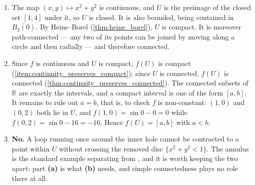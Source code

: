 \begin{exercisesolution}
\label{sol:annulus_continuous_image}
\begin{enumerate}[label=\textbf{(\alph*)}]
  \item The map $(x,y) \mapsto x^2+y^2$ is continuous, and $U$ is the preimage of the closed set
    $[1,4]$ under it, so $U$ is closed. It is also bounded, being contained in
    $\overline{B_2(0)}$. By Heine--Borel (\cref{thm:heine_borel}), $U$ is compact. It is moreover
    path-connected --- any two of its points can be joined by moving along a circle and then
    radially --- and therefore connected.

  \item Since $f$ is continuous and $U$ is compact, $f(U)$ is compact
    (\cref{item:continuity_preserves_compact}); since $U$ is connected, $f(U)$ is connected
    (\cref{thm:continuity_preserves_connected}). The connected subsets of $\mathbb{R}$ are exactly
    the intervals, and a compact interval is one of the form $[a,b]$. It remains to rule out
    $a = b$, that is, to check $f$ is non-constant: $(1,0)$ and $(0,2)$ both lie in $U$, and
    $f(1,0) = \sin 0 - 0 = 0$ while $f(0,2) = \sin 0 - 16 = -16$. Hence $f(U) = [a,b]$ with $a < b$.

  \item \textbf{No.} A loop running once around the inner hole cannot be contracted to a point
    within $U$ without crossing the removed disc $\{x^2+y^2 < 1\}$. The annulus is the standard
    example separating  from , and it is worth keeping the two
    apart: part \textbf{(a)} is what \textbf{(b)} needs, and simple connectedness plays no role
    there at all.
\end{enumerate}
\end{exercisesolution}

